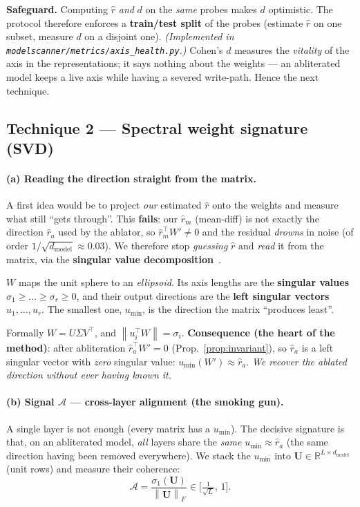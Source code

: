 \documentclass[11pt,a4paper]{article}
\theoremstyle{definition}
\theoremstyle{plain}
\newcommand{\R}{\mathbb{R}}
\newcommand{\rhat}{\hat{r}}
\newcommand{\norm}[1]{\left\lVert #1 \right\rVert}
\newcommand{\dmodel}{d_{\text{model}}}
\begin{document}
\noindent\textbf{Safeguard.} Computing $\rhat$ \emph{and} $d$ on the \emph{same}
probes makes $d$ optimistic. The protocol therefore enforces a \textbf{train/test
split} of the probes (estimate $\rhat$ on one subset, measure $d$ on a disjoint one).
\emph{(Implemented in \texttt{modelscanner/metrics/axis\_health.py}.)} Cohen's $d$
measures the \emph{vitality} of the axis in the representations; it says nothing about
the weights — an abliterated model keeps a live axis while having a severed
write-path. Hence the next technique.

\subsection{Technique 2 — Spectral weight signature (SVD)}\label{sec:svd}

\paragraph{(a) Reading the direction straight from the matrix.}
A first idea would be to project \emph{our} estimated $\rhat$ onto the weights and
measure what still ``gets through''. This \textbf{fails}: our $\rhat_m$ (mean-diff) is
not exactly the direction $\rhat_a$ used by the ablator, so $\rhat_m^\top W'\neq 0$
and the residual \emph{drowns} in noise (of order $1/\sqrt{\dmodel}\approx 0.03$). We
therefore stop \emph{guessing} $\rhat$ and \emph{read} it from the matrix, via the
\textbf{singular value decomposition}~\cite{golub2013}.

\begin{intuition}
$W$ maps the unit sphere to an \emph{ellipsoid}. Its axis lengths are the
\textbf{singular values} $\sigma_1\ge\dots\ge\sigma_r\ge 0$, and their output
directions are the \textbf{left singular vectors} $u_1,\dots,u_r$. The smallest one,
$u_{\min}$, is the direction the matrix ``produces least''.
\end{intuition}

\noindent Formally $W=U\Sigma V^\top$, and $\norm{u_i^\top W}=\sigma_i$.
\textbf{Consequence (the heart of the method)}: after abliteration $\rhat_a^\top W'=0$
(Prop.~\ref{prop:invariant}), so $\rhat_a$ is a left singular vector with
\emph{zero} singular value: $u_{\min}(W')\approx\rhat_a$. \emph{We recover the
ablated direction without ever having known it.}

\paragraph{(b) Signal $\mathcal{A}$ — cross-layer alignment (the smoking gun).}
A single layer is not enough (every matrix has a $u_{\min}$). The decisive signature
is that, on an abliterated model, \emph{all} layers share the \emph{same}
$u_{\min}\approx\rhat_a$ (the same direction having been removed everywhere). We stack
the $u_{\min}$ into $\mathbf{U}\in\R^{L\times\dmodel}$ (unit rows) and measure their
coherence:
\begin{equation}\label{eq:align}
  \mathcal{A}=\frac{\sigma_1(\mathbf{U})}{\norm{\mathbf{U}}_F}\in\Big[\tfrac{1}{\sqrt{L}},\,1\Big].
\end{equation}
\end{document}
